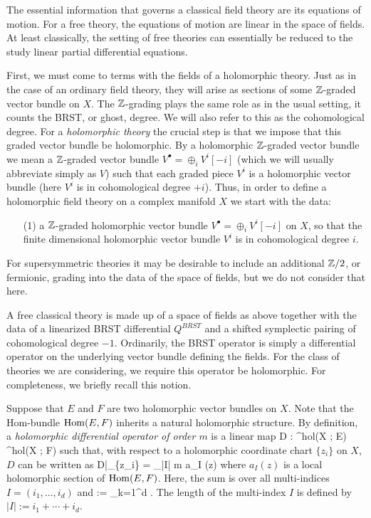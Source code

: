 \documentclass[10pt]{amsart}
\begin{document}
The essential information that governs a classical field theory are its equations of motion. 
For a free theory, the equations of motion are linear in the space of fields.
At least classically, the setting of free theories can essentially be reduced to the study linear partial differential equations.

First, we must come to terms with the fields of a holomorphic theory. 
Just as in the case of an ordinary field theory, they will arise as sections of some $\mathbb Z$-graded vector bundle on $X$.
The $\mathbb Z$-grading plays the same role as in the usual setting, it counts the BRST, or ghost, degree. 
We will also refer to this as the cohomological degree.
For a {\em holomorphic theory} the crucial step is that we impose that this graded vector bundle be holomorphic.  
By a holomorphic $\mathbb Z$-graded vector bundle we mean a $\mathbb Z$-graded vector bundle $
V^\bullet = \oplus_i V^i [-i]$ (which we will usually abbreviate simply as $V$) such that each graded piece $V^i$ is a holomorphic vector bundle (here $V^i$ is in cohomological degree $+i$).
Thus, in order to define a holomorphic field theory on a complex manifold $X$ we start with the data:

\begin{itemize}
\item[(1)] a $\mathbb Z$-graded holomorphic vector bundle $V^\bullet = \oplus_i V^i [-i]$ on $X$, so that the finite dimensional holomorphic vector bundle $V^i$ is in cohomological degree $i$. 
\end{itemize}

\begin{rmk}
For supersymmetric theories it may be desirable to include an additional $\mathbb Z/2$, or fermionic, grading into the data of the space of fields, but we do not consider that here.
\end{rmk}

A free classical theory is made up of a space of fields as above together with the data of a linearized BRST differential $Q^{BRST}$ and a shifted symplectic pairing of cohomological degree $-1$. 
Ordinarily, the BRST operator is simply a differential operator on the underlying vector bundle defining the fields. 
For the class of theories we are considering, we require this operator be holomorphic. 
For completeness, we briefly recall this notion.

Suppose that $E$ and $F$ are two holomorphic vector bundles on $X$.
Note that the Hom-bundle ${\rm Hom}(E,F)$ inherits a natural holomorphic structure. 
By definition, a {\em holomorphic differential operator of order $m$} is a linear map
\ben
D : \Gamma^{hol}(X ; E) \to \Gamma^{hol}(X ; F)
\een
such that, with respect to a holomorphic coordinate chart $\{z_i\}$ on $X$, $D$ can be written as
\be\label{local holomorphic}
D|_{\{z_i\}} = \sum_{|I| \leq m} a_I (z) 
\ee
where $a_I(z)$ is a local holomorphic section of ${\rm Hom}(E,F)$.
Here, the sum is over all multi-indices $I = (i_1,\ldots, i_d)$ and 
\ben
{} := \prod_{k=1}^d  . 
\een 
The length of the multi-index $I$ is defined by $|I| := i_1 + \cdots + i_d$. 
\end{document}
